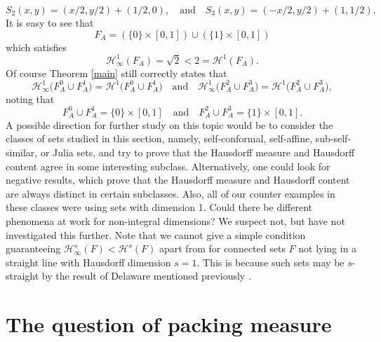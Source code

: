 \documentclass[11pt,english,british]{article}
\numberwithin{equation}{section}
\begin{document}
\[
S_2(x,y) = (x/2,y/2) + (1/2,0), \quad \text{and}  \quad S_3(x,y) = (-x/2,y/2) + (1, 1/2).
\]
It is easy to see that
\[
F_A =( \{0\} \times [0,1]) \cup (\{1\} \times [0,1])
\]
which satisfies
\[
 \mathcal{H}_\infty^1 (F_A) = \sqrt{2} <  2 =  \mathcal{H}^1 (F_A).
\]
Of course Theorem \ref{main} still correctly states that
\[
 \mathcal{H}^1_\infty \big(F_A^0 \cup F_A^1\big) =   \mathcal{H}^1 \big(F_A^0 \cup F_A^1\big)  \quad \text{and}  \quad  \mathcal{H}_\infty^1 \big(F_A^2 \cup F_A^3\big) =   \mathcal{H}^1\big(F_A^2 \cup F_A^3\big),
\]
noting that
\[
F_A^0 \cup F_A^1 = \{0\} \times [0,1] \quad \text{and}  \quad  F_A^2 \cup F_A^3 = \{1\} \times [0,1].
\]
A possible direction for further study on this topic would be to consider the classes of sets studied in this section, namely, self-conformal, self-affine, sub-self-similar, or Julia sets, and try to prove that the Hausdorff measure and Hausdorff content agree in some interesting subclass.  Alternatively, one could look for negative results, which prove that the Hausdorff measure and Hausdorff content are always distinct in certain subclasses.   Also, all of our counter examples in these classes were using sets with dimension 1.  Could there be different phenomena at work for non-integral dimensions?  We suspect not, but have not investigated this further.  Note that we cannot give a simple condition guaranteeing $\mathcal{H}_\infty^s(F) < \mathcal{H}^s(F)$ apart from for connected sets $F$ not lying in a straight line with Hausdorff dimension $s=1$.  This is because such sets may be $s$-straight by the result of Delaware mentioned previously \cite{delaware}.  








\section{The question of packing measure} \label{packing_sec}
\end{document}
